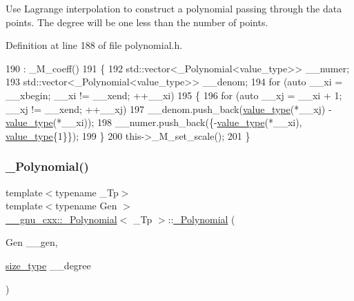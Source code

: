 Use Lagrange interpolation to construct a polynomial passing through the data points. The degree will be one less than the number of points. 

Definition at line 188 of file polynomial.\+h.


\begin{DoxyCode}
190         : \_M\_coeff()
191         \{
192           std::vector<\_Polynomial<value\_type>> \_\_numer;
193           std::vector<\_Polynomial<value\_type>> \_\_denom;
194           \textcolor{keywordflow}{for} (\textcolor{keyword}{auto} \_\_xi = \_\_xbegin; \_\_xi != \_\_xend; ++\_\_xi)
195             \{
196               \textcolor{keywordflow}{for} (\textcolor{keyword}{auto} \_\_xj = \_\_xi + 1; \_\_xj != \_\_xend; ++\_\_xj)
197                 \_\_denom.push\_back(\hyperlink{class____gnu__cxx_1_1__Polynomial_a725563351f50e76084a7a016c06f8a53}{value\_type}(*\_\_xj) - \hyperlink{class____gnu__cxx_1_1__Polynomial_a725563351f50e76084a7a016c06f8a53}{value\_type}(*\_\_xi));
198               \_\_numer.push\_back(\{-\hyperlink{class____gnu__cxx_1_1__Polynomial_a725563351f50e76084a7a016c06f8a53}{value\_type}(*\_\_xi), \hyperlink{class____gnu__cxx_1_1__Polynomial_a725563351f50e76084a7a016c06f8a53}{value\_type}\{1\}\});
199             \}
200           this->\_M\_set\_scale();
201         \}
\end{DoxyCode}
\mbox{\label{class____gnu__cxx_1_1__Polynomial_ad6e0daed9aa3a89cd98441a0fc4fa9f1}} 
\subsubsection{\texorpdfstring{\+\_\+\+Polynomial()}{\_Polynomial()}\hspace{0.1cm}{\footnotesize\ttfamily [9/9]}}
{\footnotesize\ttfamily template$<$typename \+\_\+\+Tp$>$ \\
template$<$typename Gen $>$ \\
\hyperlink{class____gnu__cxx_1_1__Polynomial}{\+\_\+\+\_\+gnu\+\_\+cxx\+::\+\_\+\+Polynomial}$<$ \+\_\+\+Tp $>$\+::\hyperlink{class____gnu__cxx_1_1__Polynomial}{\+\_\+\+Polynomial} (\begin{DoxyParamCaption}\item[{Gen}]{\+\_\+\+\_\+gen,  }\item[{\hyperlink{class____gnu__cxx_1_1__Polynomial_a6afe219c123c7a2fdc5abac8a6639053}{size\+\_\+type}}]{\+\_\+\+\_\+degree }\end{DoxyParamCaption})\hspace{0.3cm}{\ttfamily [inline]}}

